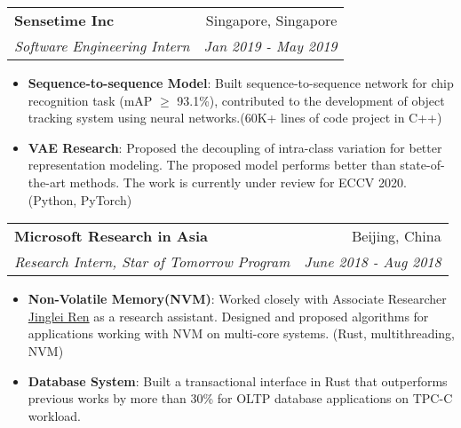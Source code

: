 \documentclass[letterpaper,11pt]{article}
\makeatletter
\newcommand{\resumeItem}[2]{
  \item\small{
    \textbf{#1}{: #2 \vspace{-3pt}}
  }
}
\newcommand{\resumeSubheading}[4]{
  \vspace{-1pt}\item
    \begin{tabular*}{0.97\textwidth}[t]{l@{\extracolsep{\fill}}r}
      \textbf{#1} & #2 \\
      \textit{\small#3} & \textit{\small #4} \\
    \end{tabular*}\vspace{-5pt}
}
\newcommand{\resumeItemListStart}{\begin{itemize}}
\newcommand{\resumeItemListEnd}{\end{itemize}\vspace{-5pt}}
\makeatother
\begin{document}
    \resumeSubheading
      {Sensetime Inc}{Singapore, Singapore}
      {Software Engineering Intern}{Jan 2019 - May 2019}
      \resumeItemListStart
      \resumeItem{Sequence-to-sequence Model}
      { Built sequence-to-sequence network for chip recognition task (mAP $\geq$ 93.1\%), contributed to the development of object tracking system using neural networks.(60K+ lines of code project in C++)}
      \resumeItem{VAE Research} 
      {Proposed the decoupling of intra-class variation for better representation modeling. The proposed model performs better than state-of-the-art methods. The work is currently under review for ECCV 2020. (Python, PyTorch)}
      \resumeItemListEnd
    \resumeSubheading
      {Microsoft Research in Asia}{Beijing, China}
      {Research Intern, Star of Tomorrow Program}{June 2018 - Aug 2018}
      \resumeItemListStart
      \resumeItem{Non-Volatile Memory(NVM)}
      {Worked closely with Associate Researcher \href{https://www.microsoft.com/en-us/research/people/jinren/}{Jinglei Ren} as a research assistant. Designed and proposed algorithms for applications working with NVM on multi-core systems. (Rust, multithreading, NVM)}
      \resumeItem{Database System} 
      {Built a transactional interface in Rust that outperforms previous works by more than 30\% for OLTP database applications on TPC-C workload.
      }
      \resumeItemListEnd

\end{document}
